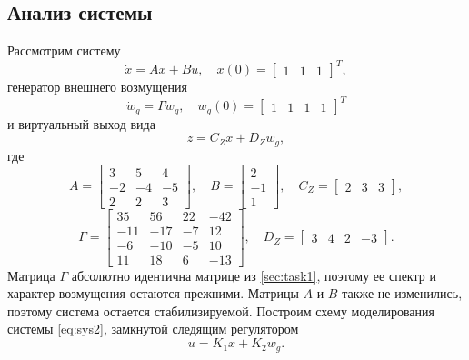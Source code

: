 \subsection{Анализ системы}
Рассмотрим систему
\begin{equation}
    \dot x=Ax+Bu,\quad x(0)=\begin{bmatrix}
        1&1&1
    \end{bmatrix}^T,
    \label{eq:sys2}
\end{equation}
генератор внешнего возмущения
\begin{equation*}
    \dot w_g=\Gamma w_g,\quad w_g(0)=\begin{bmatrix}
        1&1&1&1
    \end{bmatrix}^T
\end{equation*}
и виртуальный выход вида
\begin{equation*}
    z=C_Zx+D_Zw_g,
\end{equation*}
где
\begin{equation*}
    A=\begin{bmatrix}
        3&5&4\\
        -2&-4&-5\\
        2&2&3
    \end{bmatrix},\quad
    B=\begin{bmatrix}
        2\\-1\\1
    \end{bmatrix},\quad
    C_Z=\begin{bmatrix}
        2&3&3
    \end{bmatrix},
\end{equation*}
\begin{equation*}
    \Gamma=\begin{bmatrix}
        35&56&22&-42\\
        -11&-17&-7&12\\
        -6&-10&-5&10\\
        11&18&6&-13
    \end{bmatrix},\quad
    D_Z=\begin{bmatrix}
        3&4&2&-3
    \end{bmatrix}.
\end{equation*}
Матрица $\Gamma$ абсолютно идентична матрице из \autoref{sec:task1},
поэтому ее спектр и характер возмущения остаются прежними.
Матрицы $A$ и $B$ также не изменились, поэтому система остается
стабилизируемой. Построим схему моделирования системы \eqref{eq:sys2},
замкнутой следящим регулятором
\begin{equation}
    u=K_1x+K_2w_g.
    \label{eq:reg2}
\end{equation}
